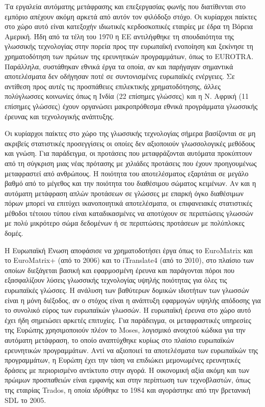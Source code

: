 \begin{multicols}{2}

Τα εργαλεία αυτόματης μετάφρασης και επεξεργασίας φωνής που διατίθενται στο εμπόριο απέχουν ακόμη αρκετά από αυτόν τον φιλόδοξο στόχο. Οι κυρίαρχοι παίκτες στο χώρο αυτό είναι κατεξοχήν ιδιωτικές κερδοσκοπικές εταιρίες με έδρα τη Βόρεια Αμερική. Ήδη από τα τέλη του 1970 η ΕΕ αντιλήφθηκε τη σπουδαιότητα της γλωσσικής τεχνολογίας στην πορεία προς την ευρωπαϊκή ενοποίηση και ξεκίνησε τη χρηματοδότηση των πρώτων της ερευνητικών προγραμμάτων, όπως το EUROTRA. Παράλληλα, συστάθηκαν εθνικά έργα τα οποία, αν και παρήγαγαν σημαντικά αποτελέσματα δεν οδήγησαν ποτέ σε συντονισμένες ευρωπαϊκές ενέργειες. Σε αντίθεση προς αυτές τις προσπάθειες επιλεκτικής χρηματοδότησης, άλλες πολύγλωσσες κοινωνίες όπως η Ινδία (22 επίσημες γλώσσες) και η Ν. Αφρική (11 επίσημες γλώσσες) έχουν οργανώσει μακροπρόθεσμα εθνικά προγράμματα γλωσσικής έρευνας και τεχνολογικής ανάπτυξης.

Οι κυρίαρχοι παίκτες στο χώρο της γλωσσικής τεχνολογίας σήμερα βασίζονται σε μη ακριβείς στατιστικές προσεγγίσεις οι οποίες δεν αξιοποιούν γλωσσολογικές μεθόδους και γνώση. Για παράδειγμα, οι προτάσεις που μεταφράζονται αυτόματα  προκύπτουν από τη σύγκριση μιας νέας πρότασης με  χιλιάδες προτάσεις που έχουν προηγουμένως μεταφραστεί από ανθρώπους. Η ποιότητα του αποτελέσματος εξαρτάται σε μεγάλο βαθμό από το μέγεθος και την ποιότητα του διαθέσιμου σώματος κειμένων. Αν και η αυτόματη μετάφραση απλών προτάσεων σε γλώσσες με επαρκή όγκο διαθέσιμων πόρων μπορεί να επιτύχει ικανοποιητικά αποτελέσματα, οι επιφανειακές στατιστικές μέθοδοι τέτοιου τύπου είναι καταδικασμένες να αποτύχουν σε περιπτώσεις γλωσσών με πολύ μικρότερο σώμα δεδομένων ή σε περιπτώσεις προτάσεων με πολύπλοκες δομές.

Η Ευρωπαϊκή Ένωση αποφάσισε να χρηματοδοτήσει έργα όπως το EuroMatrix και το EuroMatrix+ (από το 2006) και το iTranslate4 (από το 2010), στο πλαίσιο των οποίων διεξάγεται βασική και εφαρμοσμένη έρευνα και παράγονται πόροι που εξασφαλίζουν λύσεις γλωσσικής τεχνολογίας υψηλής ποιότητας για όλες τις ευρωπαϊκές γλώσσες. Η ανάλυση των βαθύτερων δομικών ιδιοτήτων των γλωσσών  είναι η μόνη διέξοδος, αν ο στόχος είναι η ανάπτυξη εφαρμογών υψηλής απόδοσης για το συνολικό εύρος των ευρωπαϊκών γλωσσών. Η ευρωπαϊκή έρευνα στο χώρο αυτό έχει ήδη σημειώσει αρκετές επιτυχίες. Για παράδειγμα, οι μεταφραστικές υπηρεσίες της Ευρώπης χρησιμοποιούν πλέον το Moses, λογισμικό ανοιχτού κώδικα για την αυτόματη μετάφραση, το οποίο αναπτύχθηκε κυρίως στο πλαίσιο ευρωπαϊκών ερευνητικών προγραμμάτων. Αντί να αξιοποιεί τα αποτελέσματα των ευρωπαϊκών της προγραμμάτων, η Ευρώπη έχει την τάση να επιδιώκει μεμονωμένες ερευνητικές δράσεις  με περιορισμένο αντίκτυπο στην αγορά. Η οικονομική αξία ακόμη και των πρώιμων προσπαθειών είναι εμφανής και στην περίπτωση των τεχνοβλαστών, όπως  της εταιρίας Trados, η οποία ιδρύθηκε το 1984 και αγοράστηκε από την βρετανική SDL το 2005.


\end{multicols}
